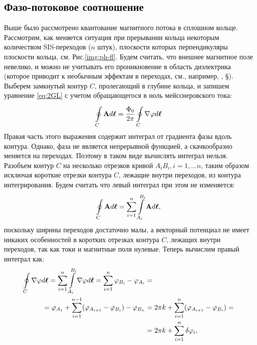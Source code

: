 \subsection{Фазо-потоковое соотношение}
Выше было рассмотрено квантование магнитного потока в сплошном кольце. Рассмотрим, как меняется ситуация при прерывании кольца некоторым количеством SIS-переходов ($n$ штук), плоскости которых перпендикуляры плоскости кольца, см. Рис.\:\ref{img:ph-fl}. Будем считать, что внешнее магнитное поле невелико, и можно не учитывать его проникновение в область диэлектрика (которое приводит к необычным эффектам в переходах, см., например, \cite{Schmidt}, \S{}). Выберем замкнутый контур $C$, пролегающий в глубине кольца, и запишем уравнение \eqref{eq:2GL} с учетом обращающегося в ноль мейсснеровского тока:
\begin{equation}
\label{eq: FFR}
\oint\displaylimits_{C}^{} \mathbf{A} d\boldsymbol{\ell} = \frac{\Phi_0}{2\pi}\oint\displaylimits_{C}^{}\nabla\varphi d\boldsymbol{\ell}
\end{equation}
Правая часть этого выражения содержит интеграл от градиента фазы вдоль контура. Однако, фаза не является непрерывной функцией, а скачкообразно меняется на переходах. Поэтому в таком виде вычислять интеграл нельзя. Разобъем контур $C$ на несколько отрезков кривой $A_iB_i, i=1,\ldots n$, таким образом исключая короткие отрезки контура $C$, лежащие внутри переходов, из контура интегрирования. Будем считать что левый интеграл при этом не изменяется:
\begin{equation}\label{eq:int_cAdl}
\oint\displaylimits_{C}^{} \mathbf{A} d\boldsymbol{\ell} = \sum_{i=1}^{n}\int\displaylimits_{A_i}^{B_i} \mathbf{A} d\boldsymbol{\ell},
\end{equation}
поскольку ширины переходов достаточно малы, а векторный потенциал не имеет никаких особенностей в коротких отрезках контура $C$, лежащих внутри переходов, так как токи и магнитные поля нулевые. Теперь вычислим правый интеграл как:
\begin{equation}
\label{eq:int_phi}
\begin{alignedat}{2}
\oint\displaylimits_{C}^{}\nabla\varphi d\boldsymbol{\ell} = \sum_{i=1}^{n}\int\displaylimits_{A_i}^{B_i}\nabla\varphi d\boldsymbol{\ell} = \sum_{i=1}^{n}\varphi_{B_i}-\varphi_{A_i} & = \\ =\varphi_{A_1} + \sum_{i=1}^{n-1}(\varphi_{A_{i+1}}-\varphi_{B_i}) - \varphi_{B_n} & = 2\pi k + \sum_{i=1}^{n}(\varphi_{A_{i+1}}-\varphi_{B_i}) = \\ 
& =2\pi k + \sum_{i=1}^{n}\delta\varphi_i,
\end{alignedat}
\end{equation}
